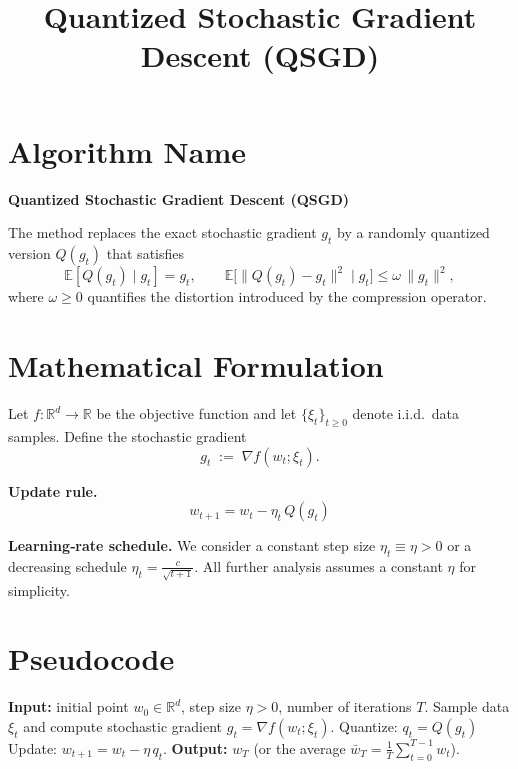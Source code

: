 \documentclass{article}
\title{Quantized Stochastic Gradient Descent (QSGD)}
\author{}
\date{}
\begin{document}
\maketitle

\section*{Algorithm Name}
\textbf{Quantized Stochastic Gradient Descent (QSGD)}  

The method replaces the exact stochastic gradient $g_t$ by a
randomly quantized version $Q(g_t)$ that satisfies
\[
\mathbb{E}[Q(g_t)\mid g_t]=g_t ,\qquad 
\mathbb{E}\!\big[\|Q(g_t)-g_t\|^{2}\mid g_t\big]\leq \omega\,\|g_t\|^{2},
\]
where $\omega\ge 0$ quantifies the distortion introduced by the
compression operator.

\section*{Mathematical Formulation}
Let $f:\mathbb{R}^{d}\rightarrow\mathbb{R}$ be the objective function and
let $\{\xi_t\}_{t\ge 0}$ denote i.i.d.\ data samples.  
Define the stochastic gradient
\[
g_t \;:=\; \nabla f(w_t;\xi_t).
\]

\noindent\textbf{Update rule.}
\[
\boxed{\,w_{t+1}=w_t-\eta_t\, Q(g_t)\,}
\tag{1}
\]

\noindent\textbf{Learning‑rate schedule.}
We consider a constant step size $\eta_t\equiv\eta>0$ or a
decreasing schedule $\eta_t = \frac{c}{\sqrt{t+1}}$.
All further analysis assumes a constant $\eta$ for simplicity.

\section*{Pseudocode}
\begin{algorithm}[H]
\caption{Quantized Stochastic Gradient Descent}
\begin{algorithmic}[1]
\State \textbf{Input:} initial point $w_0\in\mathbb{R}^d$, step size $\eta>0$, number of iterations $T$.
    \State Sample data $\xi_t$ and compute stochastic gradient $g_t=\nabla f(w_t;\xi_t)$.
    \State Quantize: $q_t = Q(g_t)$   
    \State Update: $w_{t+1}= w_t - \eta\, q_t$.
\EndFor
\State \textbf{Output:} $w_T$ (or the average $\bar w_T=\frac1T\sum_{t=0}^{T-1} w_t$).
\end{algorithmic}
\end{algorithm}
\end{document}
